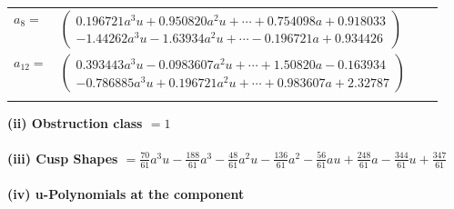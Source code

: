 \documentclass[1p]{elsarticle_modified}
\theoremstyle{definition}
\begin{document}
\begin{tabular}{m{7pt} m{180pt} m{7pt} m{180pt} }
\flushright $a_{8}=$&$\begin{pmatrix}0.196721 a^{3} u+0.950820 a^{2} u+\cdots+0.754098 a+0.918033\\-1.44262 a^{3} u-1.63934 a^{2} u+\cdots-0.196721 a+0.934426\end{pmatrix}$ \\
\flushright $a_{12}=$&$\begin{pmatrix}0.393443 a^{3} u-0.0983607 a^{2} u+\cdots+1.50820 a-0.163934\\-0.786885 a^{3} u+0.196721 a^{2} u+\cdots+0.983607 a+2.32787\end{pmatrix}$\\&\end{tabular}
\flushleft \textbf{(ii) Obstruction class $= 1$}\\~\\
\flushleft \textbf{(iii) Cusp Shapes $= \frac{70}{61} a^3 u-\frac{188}{61} a^3-\frac{48}{61} a^2 u-\frac{136}{61} a^2-\frac{56}{61} a u+\frac{248}{61} a-\frac{344}{61} u+\frac{347}{61}$}\\~\\
\newpage\renewcommand{\arraystretch}{1}
\flushleft \textbf{(iv) u-Polynomials at the component}\newline \\
\end{document}
